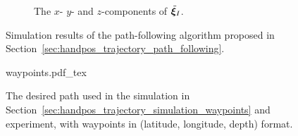 \begin{figure}[htb]
\begin{minipage}{0.48\textwidth}

        \begin{subfigure}{\textwidth}
            
            \vspace*{-8mm}
            \caption{The $x$- $y$- and $z$-components of $\tilde{\bm{\xi}}_I$.}
            \label{fig:waypoint_integral}
        \end{subfigure}
        \vspace*{-4mm}
    \end{minipage}
    \caption{Simulation results of the path-following algorithm proposed in Section~\ref{sec:handpos_trajectory_path_following}.
    }
    \label{fig:waypoint_following}
\end{figure}

\begin{figure}[tb]
    \centering
    \def\svgwidth{0.7\textwidth}
    
    {waypoints.pdf_tex}
    \vspace*{-0.5mm}
    \caption{The desired path used in the simulation in Section~\ref{sec:handpos_trajectory_simulation_waypoints} and experiment, with waypoints in (latitude, longitude, depth) format.}
    \label{fig:waypoints}
\end{figure}
